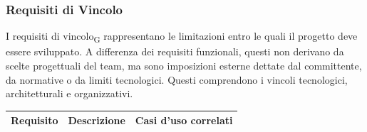 \documentclass[11pt,a4paper]{article}
\begin{document}
\newpage
\subsubsection{Requisiti di Vincolo}
I requisiti di vincolo\textsubscript{G} rappresentano le limitazioni entro le quali il progetto deve essere sviluppato. A differenza dei requisiti funzionali, questi non derivano da scelte progettuali del team, ma sono imposizioni esterne dettate dal committente, da normative o da limiti tecnologici.
Questi comprendono i vincoli tecnologici, architetturali e organizzativi.

\begin{longtable}{|p{}|>{\raggedright\arraybackslash}p{}|p{}|}
\hline
\textbf{Requisito} & \textbf{Descrizione} & \textbf{Casi d'uso correlati}\\
\hline


\end{longtable}
\end{document}

